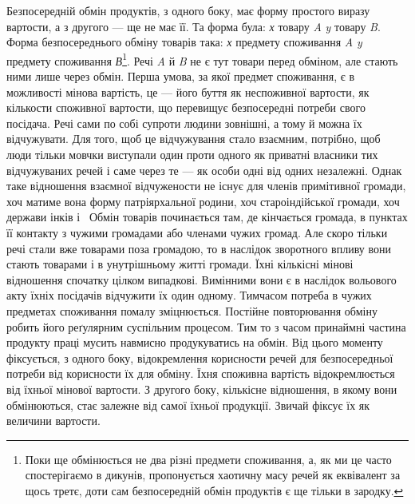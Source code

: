 Безпосередній обмін продуктів, з одного боку, має форму
простого виразу вартости, а з другого — ще не має її. Та форма
була: \emph{х} товару \emph{A} \deq{} \emph{y} товару \emph{B}. Форма безпосереднього обміну
товарів така: \emph{х} предмету споживання \emph{A} \deq{} \emph{y} предмету споживання
\emph{В}\footnote{
Поки ще обмінюється не два різні предмети споживання, а, як
ми це часто спостерігаємо в дикунів, пропонується хаотичну масу речей
як еквівалент за щось третє, доти сам безпосередній обмін продуктів є
ще тільки в зародку.
}. Речі \emph{A} й \emph{B} не є тут товари перед обміном, але стають ними
лише через обмін. Перша умова, за якої предмет споживання,
є в можливості мінова вартість, це — його буття як неспоживної
вартости, як кількости споживної вартости, що перевищує
безпосередні потреби свого посідача. Речі сами по собі супроти
людини зовнішні, а тому й можна їх відчужувати. Для того,
щоб це відчужування стало взаємним, потрібно, щоб люди тільки
мовчки виступали один проти одного як приватні власники тих
відчужуваних речей і саме через те — як особи одні від одних
незалежні. Однак таке відношення взаємної відчужености не
існує для членів примітивної громади, хоч матиме вона форму
патріярхальної родини, хоч староіндійської громади, хоч держави
інків і~ Обмін товарів починається там, де кінчається
громада, в пунктах її контакту з чужими громадами або членами
чужих громад. Але скоро тільки речі стали вже товарами поза
громадою, то в наслідок зворотного впливу вони стають товарами
і в унутрішньому житті громади. Їхні кількісні мінові відношення
спочатку цілком випадкові. Вимінними вони є в наслідок
вольового акту їхніх посідачів відчужити їх один одному. Тимчасом
потреба в чужих предметах споживання помалу зміцнюється.
Постійне повторювання обміну робить його реґулярним
суспільним процесом. Тим то з часом принаймні частина продукту
праці мусить навмисно продукуватись на обмін. Від цього моменту
фіксується, з одного боку, відокремлення корисности речей
для безпосередньої потреби від корисности їх для обміну. Їхня
споживна вартість відокремлюється від їхньої мінової вартости.
З другого боку, кількісне відношення, в якому вони обмінюються,
стає залежне від самої їхньої продукції. Звичай фіксує їх як
величини вартости.

